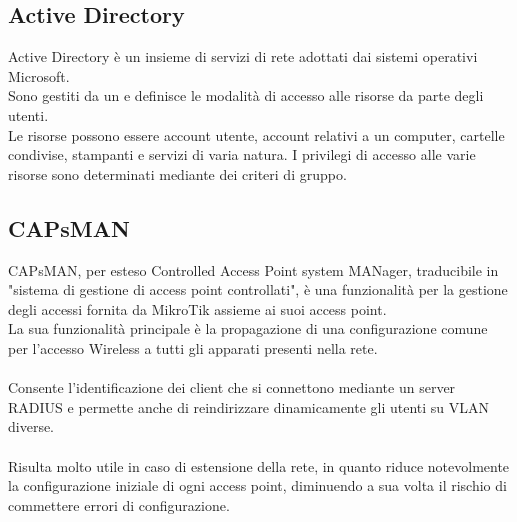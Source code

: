\documentclass[Tesi.tex]{subfiles}
\begin{document}
\subsection{Active Directory}
Active Directory è un insieme di servizi di rete adottati dai sistemi operativi Microsoft. \\
Sono gestiti da un  e definisce le modalità di accesso alle risorse da parte degli utenti. \\
Le risorse possono essere account utente, account relativi a un computer, cartelle condivise, stampanti e servizi di varia natura. I privilegi di accesso alle varie risorse sono determinati mediante dei criteri di gruppo.

\subsection{CAPsMAN}
CAPsMAN, per esteso Controlled Access Point system MANager, traducibile in "sistema di gestione di access point controllati", è una funzionalità per la gestione degli accessi fornita da MikroTik assieme ai suoi access point. \\
La sua funzionalità principale è la propagazione di una configurazione comune per l'accesso Wireless a tutti gli apparati presenti nella rete. \\\\
Consente l'identificazione dei client che si connettono mediante un server RADIUS e permette anche di reindirizzare dinamicamente gli utenti su VLAN diverse. \\\\
Risulta molto utile in caso di estensione della rete, in quanto riduce notevolmente la configurazione iniziale di ogni access point, diminuendo a sua volta il rischio di commettere errori di configurazione.
\end{document}
